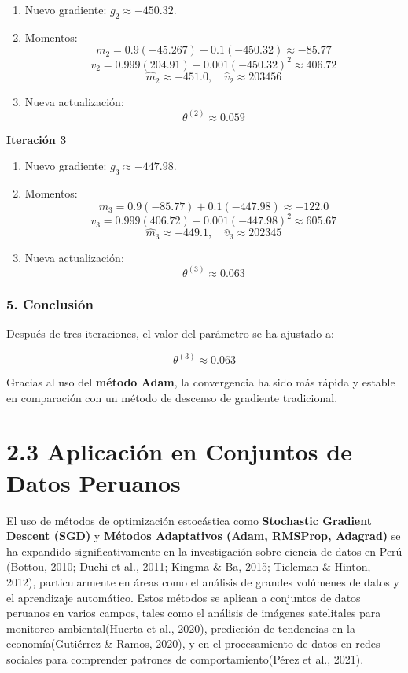 \documentclass[a5paper]{article}
\begin{document}
	\begin{enumerate}
		\item Nuevo gradiente: \( g_2 \approx -450.32 \).
		\item Momentos:
		\[
		m_2 = 0.9(-45.267) + 0.1(-450.32) \approx -85.77
		\]
		\[
		v_2 = 0.999(204.91) + 0.001(-450.32)^2 \approx 406.72
		\]
		\[
		\hat{m}_2 \approx -451.0, \quad \hat{v}_2 \approx 203456
		\]
		
		\item Nueva actualización:
		\[
		\theta^{(2)} \approx 0.059
		\]
	\end{enumerate}
	
	\textbf{Iteración 3}
	
	\begin{enumerate}
		\item Nuevo gradiente: \( g_3 \approx -447.98 \).
		\item Momentos:
		\[
		m_3 = 0.9(-85.77) + 0.1(-447.98) \approx -122.0
		\]
		\[
		v_3 = 0.999(406.72) + 0.001(-447.98)^2 \approx 605.67
		\]
		\[
		\hat{m}_3 \approx -449.1, \quad \hat{v}_3 \approx 202345
		\]
		
		\item Nueva actualización:
		\[
		\theta^{(3)} \approx 0.063
		\]
	\end{enumerate}
	
	\subsubsection*{5. Conclusión}
	
	Después de tres iteraciones, el valor del parámetro se ha ajustado a:
	
	\[
	\theta^{(3)} \approx 0.063
	\]
	
	Gracias al uso del \textbf{método Adam}, la convergencia ha sido más rápida y estable en comparación con un método de descenso de gradiente tradicional.
	
	
	\section*{2.3 Aplicación en Conjuntos de Datos Peruanos}
	
	El uso de métodos de optimización estocástica como \textbf{Stochastic Gradient Descent (SGD)} y \textbf{Métodos Adaptativos (Adam, RMSProp, Adagrad)} se ha expandido significativamente en la investigación sobre ciencia de datos en Perú (Bottou, 2010; Duchi et al., 2011; Kingma \& Ba, 2015; Tieleman \& Hinton, 2012), particularmente en áreas como el análisis de grandes volúmenes de datos y el aprendizaje automático. Estos métodos se aplican a conjuntos de datos peruanos en varios campos, tales como el análisis de imágenes satelitales para monitoreo ambiental(Huerta et al., 2020), predicción de tendencias en la economía(Gutiérrez \& Ramos, 2020), y en el procesamiento de datos en redes sociales para comprender patrones de comportamiento(Pérez et al., 2021).
	
\end{document}
